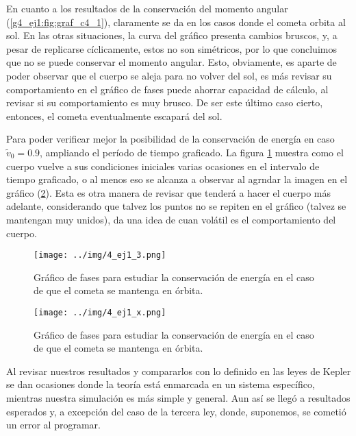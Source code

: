 \documentclass[../portafolio.tex]{subfiles}
\begin{document}
En cuanto a los resultados de la conservación del momento angular (\ref{g4_ej1:fig:graf_c4_1}), claramente se da en los casos donde el cometa orbita al sol. En las otras situaciones, la curva del gráfico presenta cambios bruscos, y, a pesar de replicarse cíclicamente, estos no son simétricos, por lo que concluimos que no se puede conservar el momento angular. Esto, obviamente, es aparte de poder observar que el cuerpo se aleja para no volver del sol, es más revisar su comportamiento en el gráfico de fases puede ahorrar capacidad de cálculo, al revisar si su comportamiento es muy brusco. De ser este último caso cierto, entonces, el cometa eventualmente escapará del sol.
 
Para poder verificar mejor la posibilidad de la conservación de energía en caso $\tilde{v}_0=0.9$, ampliando el período de tiempo graficado. La figura \ref{g4_ej1:fig:graf_c4_3} muestra como el cuerpo vuelve a sus condiciones iniciales varias ocasiones en el intervalo de tiempo graficado, o al menos eso se alcanza a observar al agrndar la imagen en el gráfico (\ref{g4_ej1:fig:graf_c4_x}). Esta es otra manera de revisar que tenderá a hacer el cuerpo más adelante, considerando que talvez los puntos no se repiten en el gráfico (talvez se mantengan muy unidos), da una idea de cuan volátil es el comportamiento del cuerpo.
\begin{figure}
\centering
\texttt{[image: ../img/4\_ej1\_3.png]}
\caption{Gráfico de fases para estudiar la conservación de energía en el caso de que el cometa se mantenga en órbita.} \label{g4_ej1:fig:graf_c4_3}
\end{figure}
\begin{figure}
\centering
\texttt{[image: ../img/4\_ej1\_x.png]}
\caption{Gráfico de fases para estudiar la conservación de energía en el caso de que el cometa se mantenga en órbita.} \label{g4_ej1:fig:graf_c4_x}
\end{figure}

Al revisar nuestros resultados y compararlos con lo definido en las leyes de Kepler se dan ocasiones donde la teoría está enmarcada en un sistema específico, mientras nuestra simulación es más simple y general. Aun así se llegó a resultados esperados y, a excepción del caso de la tercera ley, donde, suponemos, se cometió un error al programar.
\end{document}
